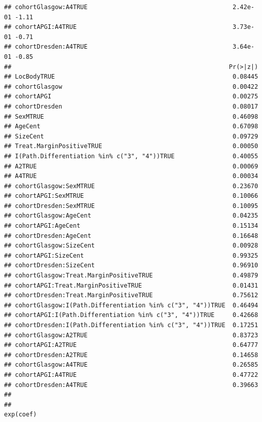 \documentclass{article}\usepackage[]{graphicx}\usepackage[]{color}
\makeatletter
\newenvironment{kframe}{%
 \def\at@end@of@kframe{}%
 \ifinner\ifhmode%
  \def\at@end@of@kframe{\end{minipage}}%
  \begin{minipage}{\columnwidth}%
 \fi\fi%
 \def\FrameCommand##1{\hskip\@totalleftmargin \hskip-\fboxsep
 \colorbox{shadecolor}{##1}\hskip-\fboxsep
     \hskip-\linewidth \hskip-\@totalleftmargin \hskip\columnwidth}%
 \MakeFramed {\advance\hsize-\width
   \@totalleftmargin\z@ \linewidth\hsize
   \@setminipage}}%
 {\par\unskip\endMakeFramed%
 \at@end@of@kframe}
\newenvironment{knitrout}{}{} %
\makeatother
\begin{document}
\begin{knitrout}
\begin{kframe}
\begin{verbatim}
## cohortGlasgow:A4TRUE                                        2.42e-01 -1.11
## cohortAPGI:A4TRUE                                           3.73e-01 -0.71
## cohortDresden:A4TRUE                                        3.64e-01 -0.85
##                                                            Pr(>|z|)
## LocBodyTRUE                                                 0.08445
## cohortGlasgow                                               0.00422
## cohortAPGI                                                  0.00275
## cohortDresden                                               0.08017
## SexMTRUE                                                    0.46098
## AgeCent                                                     0.67098
## SizeCent                                                    0.09729
## Treat.MarginPositiveTRUE                                    0.00050
## I(Path.Differentiation %in% c("3", "4"))TRUE                0.40055
## A2TRUE                                                      0.00069
## A4TRUE                                                      0.00034
## cohortGlasgow:SexMTRUE                                      0.23670
## cohortAPGI:SexMTRUE                                         0.10066
## cohortDresden:SexMTRUE                                      0.10095
## cohortGlasgow:AgeCent                                       0.04235
## cohortAPGI:AgeCent                                          0.15134
## cohortDresden:AgeCent                                       0.16648
## cohortGlasgow:SizeCent                                      0.00928
## cohortAPGI:SizeCent                                         0.99325
## cohortDresden:SizeCent                                      0.96910
## cohortGlasgow:Treat.MarginPositiveTRUE                      0.49879
## cohortAPGI:Treat.MarginPositiveTRUE                         0.01431
## cohortDresden:Treat.MarginPositiveTRUE                      0.75612
## cohortGlasgow:I(Path.Differentiation %in% c("3", "4"))TRUE  0.46494
## cohortAPGI:I(Path.Differentiation %in% c("3", "4"))TRUE     0.42668
## cohortDresden:I(Path.Differentiation %in% c("3", "4"))TRUE  0.17251
## cohortGlasgow:A2TRUE                                        0.83723
## cohortAPGI:A2TRUE                                           0.64777
## cohortDresden:A2TRUE                                        0.14658
## cohortGlasgow:A4TRUE                                        0.26585
## cohortAPGI:A4TRUE                                           0.47722
## cohortDresden:A4TRUE                                        0.39663
## 
##                                                            exp(coef)

\end{verbatim}
\end{kframe}
\end{knitrout}
\end{document}
